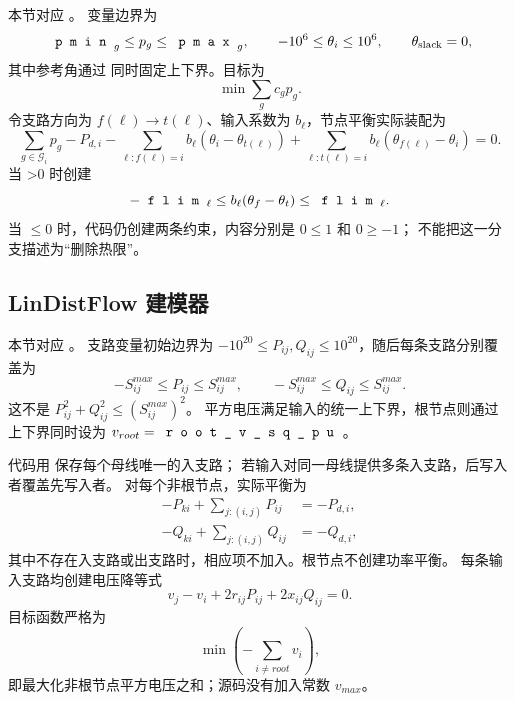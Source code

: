 本节对应 。
变量边界为
\begin{equation}
 \fld{pmin}_g\le p_g\le\fld{pmax}_g,
 \qquad -10^6\le\theta_i\le10^6,
 \qquad\theta_{\mathrm{slack}}=0,
\end{equation}
其中参考角通过  同时固定上下界。目标为
\begin{equation}
 \min\sum_g c_g p_g.
\end{equation}
令支路方向为 $f(\ell)\rightarrow t(\ell)$、输入系数为 $b_\ell$，节点平衡实际装配为
\begin{equation}
 \sum_{g\in\mathcal G_i}p_g-P_{d,i}
 -\sum_{\ell:f(\ell)=i}b_\ell(\theta_i-\theta_{t(\ell)})
 +\sum_{\ell:t(\ell)=i}b_\ell(\theta_{f(\ell)}-\theta_i)=0.
\end{equation}
当 >0 时创建
\begin{equation}
 -\fld{flim}_\ell\le b_\ell(\theta_f-\theta_t)\le\fld{flim}_\ell.
\end{equation}
当 $\le0$ 时，代码仍创建两条约束，内容分别是 $0\le1$ 和 $0\ge-1$；
不能把这一分支描述为“删除热限”。

\subsection{LinDistFlow 建模器}

本节对应 。
支路变量初始边界为 $-10^{20}\le P_{ij},Q_{ij}\le10^{20}$，随后每条支路分别覆盖为
\begin{equation}
 -S_{ij}^{max}\le P_{ij}\le S_{ij}^{max},\qquad
 -S_{ij}^{max}\le Q_{ij}\le S_{ij}^{max}.
\end{equation}
这不是 $P_{ij}^2+Q_{ij}^2\le(S_{ij}^{max})^2$。
平方电压满足输入的统一上下界，根节点则通过上下界同时设为
$v_{root}=\fld{root\_v\_sq\_pu}$。

代码用  保存每个母线唯一的入支路；
若输入对同一母线提供多条入支路，后写入者覆盖先写入者。
对每个非根节点，实际平衡为
\begin{align}
 -P_{ki}+\sum_{j:(i,j)}P_{ij}&=-P_{d,i},\\
 -Q_{ki}+\sum_{j:(i,j)}Q_{ij}&=-Q_{d,i},
\end{align}
其中不存在入支路或出支路时，相应项不加入。根节点不创建功率平衡。
每条输入支路均创建电压降等式
\begin{equation}
 v_j-v_i+2r_{ij}P_{ij}+2x_{ij}Q_{ij}=0.
\end{equation}
目标函数严格为
\begin{equation}
 \min\left(-\sum_{i\ne root}v_i\right),
\end{equation}
即最大化非根节点平方电压之和；源码没有加入常数 $v_{max}$。

